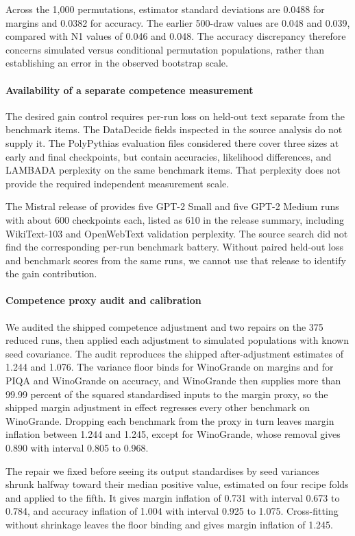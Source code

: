 Across the 1,000 permutations, estimator standard deviations are 0.0488 for margins and 0.0382 for accuracy. The earlier 500-draw values are 0.048 and 0.039, compared with N1 values of 0.046 and 0.048. The accuracy discrepancy therefore concerns simulated versus conditional permutation populations, rather than establishing an error in the observed bootstrap scale.

\paragraph{Availability of a separate competence measurement}
The desired gain control requires per-run loss on held-out text separate from the benchmark items. The DataDecide fields inspected in the source analysis do not supply it. The PolyPythias evaluation files considered there cover three sizes at early and final checkpoints, but contain accuracies, likelihood differences, and LAMBADA perplexity on the same benchmark items. That perplexity does not provide the required independent measurement scale.

The Mistral release of \citet{karamcheti2021} provides five GPT-2 Small and five GPT-2 Medium runs with about 600 checkpoints each, listed as 610 in the release summary, including WikiText-103 and OpenWebText validation perplexity. The source search did not find the corresponding per-run benchmark battery. Without paired held-out loss and benchmark scores from the same runs, we cannot use that release to identify the gain contribution.

\paragraph{Competence proxy audit and calibration}
\label{app:proxy}
We audited the shipped competence adjustment and two repairs on the 375 reduced runs, then applied each adjustment to simulated populations with known seed covariance. The audit reproduces the shipped after-adjustment estimates of 1.244 and 1.076. The variance floor binds for WinoGrande on margins and for PIQA and WinoGrande on accuracy, and WinoGrande then supplies more than 99.99 percent of the squared standardised inputs to the margin proxy, so the shipped margin adjustment in effect regresses every other benchmark on WinoGrande. Dropping each benchmark from the proxy in turn leaves margin inflation between 1.244 and 1.245, except for WinoGrande, whose removal gives 0.890 with interval 0.805 to 0.968.

The repair we fixed before seeing its output standardises by seed variances shrunk halfway toward their median positive value, estimated on four recipe folds and applied to the fifth. It gives margin inflation of 0.731 with interval 0.673 to 0.784, and accuracy inflation of 1.004 with interval 0.925 to 1.075. Cross-fitting without shrinkage leaves the floor binding and gives margin inflation of 1.245.

